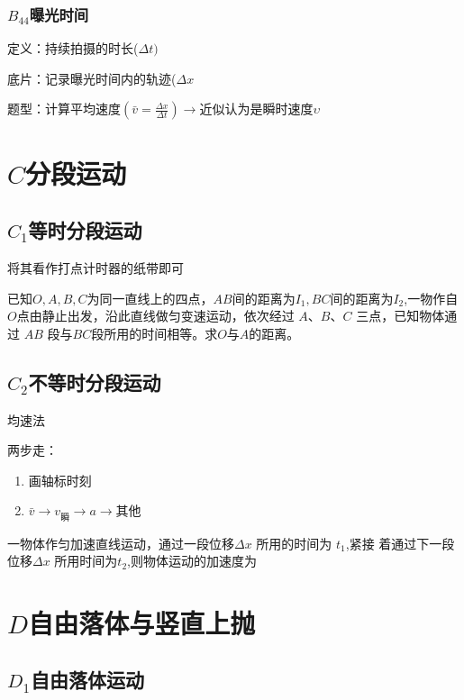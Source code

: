 \documentclass[lang=cn,10pt]{elegantbook}
\begin{document}
	\subsubsection{$B_{44}$曝光时间}
	定义：持续拍摄的时长($\Delta t)$ 
	
	底片：记录曝光时间内的轨迹($\Delta x$
	
	题型：计算平均速度$(\bar{v}=\frac{\Delta x}{\Delta t})$$\to $近似认为是瞬时速度$\upsilon$
	\section{$C$分段运动}
	\subsection{$C_{1}$等时分段运动}
	将其看作打点计时器的纸带即可
	
	\begin{example}
		已知$O,A,B,C$为同一直线上的四点，$AB$间的距离为$I_1,BC$间的距离为$I_2$,一物作自$O$点由静止出发，沿此直线做匀变速运动，依次经过 $A$、$B$、$C$ 三点，已知物体通过 $AB$ 段与$BC$段所用的时间相等。求$O$与$A$的距离。
	\end{example}
	\vspace{2cm}
	\subsection{$C_{2}$不等时分段运动}
	均速法
	
	两步走：
	\begin{enumerate}
		\item  画轴标时刻
		\item $\bar{v}\to v_\text{瞬}\to a\to\text{其他}$
	\end{enumerate}
	\vspace{2cm}
	\begin{example}
		一物体作匀加速直线运动，通过一段位移$\Delta x$  所用的时间为 $t_1$,紧接
		着通过下一段位移$\Delta x$  所用时间为$ t_2$,则物体运动的加速度为
	\end{example}
	\vspace{2cm}
	\section{$D$自由落体与竖直上抛}
	\subsection{$D_1$自由落体运动}
\end{document}
